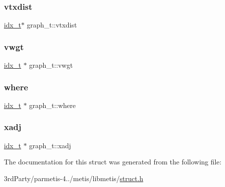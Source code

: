 \mbox{\label{structgraph__t_ae2af1f8a1bd524e3368e17d13b7752e1}} 
\subsubsection{\texorpdfstring{vtxdist}{vtxdist}}
{\footnotesize\ttfamily \hyperlink{3rd_party_2parmetis-4_80_83_2metis_2include_2metis_8h_aaa5262be3e700770163401acb0150f52}{idx\+\_\+t}$\ast$ graph\+\_\+t\+::vtxdist}

\mbox{\label{structgraph__t_a3a94894dcbf1b65a638e37cd485b5f88}} 
\subsubsection{\texorpdfstring{vwgt}{vwgt}}
{\footnotesize\ttfamily \hyperlink{3rd_party_2parmetis-4_80_83_2metis_2include_2metis_8h_aaa5262be3e700770163401acb0150f52}{idx\+\_\+t} $\ast$ graph\+\_\+t\+::vwgt}

\mbox{\label{structgraph__t_a23aa949251b3cff3f23ba5db34d6a7d5}} 
\subsubsection{\texorpdfstring{where}{where}}
{\footnotesize\ttfamily \hyperlink{3rd_party_2parmetis-4_80_83_2metis_2include_2metis_8h_aaa5262be3e700770163401acb0150f52}{idx\+\_\+t} $\ast$ graph\+\_\+t\+::where}

\mbox{\label{structgraph__t_aa92b073425f4bca4789af4cf33a547e5}} 
\subsubsection{\texorpdfstring{xadj}{xadj}}
{\footnotesize\ttfamily \hyperlink{3rd_party_2parmetis-4_80_83_2metis_2include_2metis_8h_aaa5262be3e700770163401acb0150f52}{idx\+\_\+t} $\ast$ graph\+\_\+t\+::xadj}



The documentation for this struct was generated from the following file\+:\begin{DoxyCompactItemize}
\item 
3rd\+Party/parmetis-\/4../metis/libmetis/\hyperlink{metis_2libmetis_2struct_8h}{struct.\+h}\end{DoxyCompactItemize}
